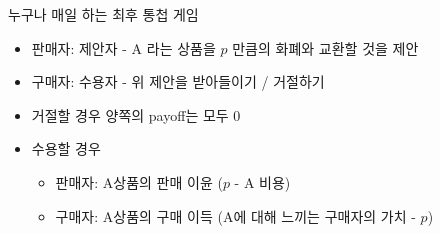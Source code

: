 \documentclass[final]{beamer}
\begin{document}
\begin{frame}[t]{누구나 매일 하는 최후 통첩 게임}
	\begin{itemize}
		\item 판매자: 제안자 - A 라는 상품을 $p$ 만큼의 화폐와 교환할 것을 제안
		\item 구매자: 수용자 - 위 제안을 받아들이기 / 거절하기
		\item 거절할 경우 양쪽의 payoff는 모두 0 
		\item 수용할 경우
		\begin{itemize}
			\item 판매자: A상품의 판매 이윤 ($p$ - A 비용)
			\item 구매자: A상품의 구매 이득 (A에 대해 느끼는 구매자의 가치 - $p$)
		\end{itemize}
	\end{itemize}
\end{frame}
\end{document}
